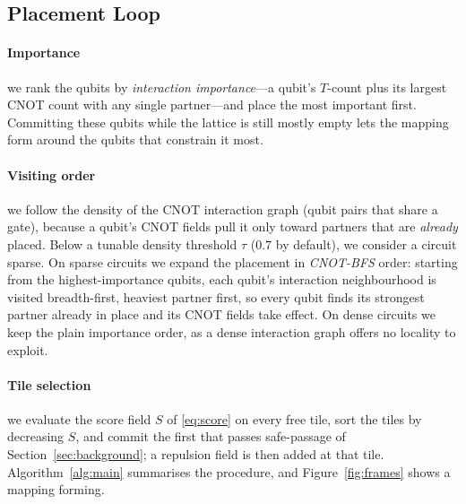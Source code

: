 \documentclass[10pt,conference]{IEEEtran}
\theoremstyle{definition}
\theoremstyle{remark}
\begin{document}
\subsection{Placement Loop}

\vspace{4pt}
\paragraph{Importance} we rank the qubits by \emph{interaction importance}---a qubit's
$T$-count plus its largest CNOT count with any single partner---and place the
most important first. Committing these qubits while the lattice is still mostly
empty lets the mapping form around the qubits that constrain it most.

\vspace{4pt}
\paragraph{Visiting order} we follow the density of the CNOT interaction graph
(qubit pairs that share a gate), because a qubit's CNOT fields pull it only toward 
partners that are \emph{already} placed. Below a tunable density threshold $\tau$ 
($0.7$ by default), we consider a circuit sparse.
On sparse circuits we expand the placement in \emph{CNOT-BFS} order: starting from the
highest-importance qubits, each qubit's interaction neighbourhood is visited
breadth-first, heaviest partner first, so every qubit finds its strongest partner
already in place and its CNOT fields take effect. On dense circuits we keep the
plain importance order, as a dense interaction graph offers no locality to exploit.

\vspace{4pt}
\paragraph{Tile selection} we evaluate the score field $S$ of \eqref{eq:score} on
every free tile, sort the tiles by decreasing $S$, and commit the first that
passes safe-passage of Section~\ref{sec:background}; a repulsion field is
then added at that tile. Algorithm~\ref{alg:main} summarises the procedure, and
Figure~\ref{fig:frames} shows a mapping forming.
\end{document}
